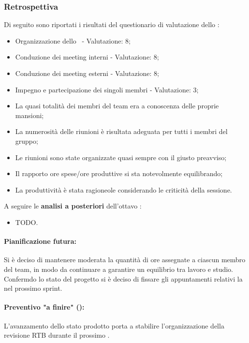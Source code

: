\subsubsection{Retrospettiva}

\par Di seguito sono riportati i risultati del questionario di valutazione dello :
\begin{itemize}
  \item Organizzazione dello \ - Valutazione: 8;
  \item Conduzione dei meeting interni - Valutazione: 8;
  \item Conduzione dei meeting esterni - Valutazione: 8;
  \item Impegno e partecipazione dei singoli membri - Valutazione: 3;
  \item La quasi totalità dei membri del team era a conoscenza delle proprie mansioni;
  \item La numerosità delle riunioni è risultata adeguata per tutti i membri del gruppo;
  \item Le riunioni sono state organizzate quasi sempre con il giusto preavviso;
  \item Il rapporto ore spese/ore produttive si sta notevolmente equilibrando;
  \item La produttività è stata ragioneole considerando le criticità della sessione.
\end{itemize}

\vspace{0.5\baselineskip}
\par A seguire le \textbf{analisi a posteriori} dell'ottavo :
\begin{itemize}
  \item TODO.
\end{itemize}

\paragraph*{Pianificazione futura:}
\par Si è deciso di mantenere moderata la quantità di ore assegnate a ciascun membro del team, in modo da continuare a garantire un equilibrio tra lavoro e studio. Confermdo lo stato del progetto si è deciso di fissare gli appuntamenti relativi la  nel prossimo sprint.

\paragraph*{Preventivo "a finire" ():}
\par L'avanzamento dello stato prodotto porta a stabilire l'organizzazione della revisione RTB durante il prossimo .

